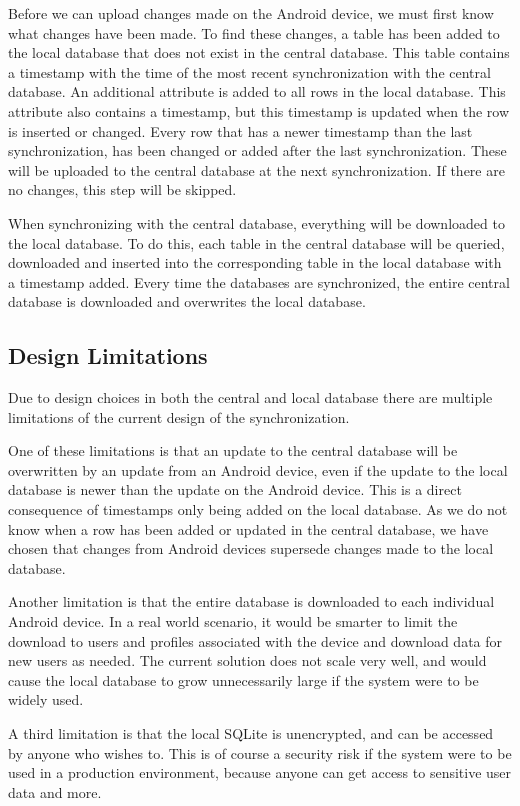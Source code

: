 Before we can upload changes made on the Android device, we must first know what changes have been made. To find these changes, a table has been added to the local database that does not exist in the central database. This table contains a timestamp with the time of the most recent synchronization with the central database. An additional attribute is added to all rows in the local database. This attribute also contains a timestamp, but this timestamp is updated when the row is inserted or changed. Every row that has a newer timestamp than the last synchronization, has been changed or added after the last synchronization. These will be uploaded to the central database at the next synchronization. If there are no changes, this step will be skipped.

When synchronizing with the central database, everything will be downloaded to the local database. To do this, each table in the central database will be queried, downloaded and inserted into the corresponding table in the local database with a timestamp added. Every time the databases are synchronized, the entire central database is downloaded and overwrites the local database.

\subsection{Design Limitations}
Due to design choices in both the central and local database there are multiple limitations of the current design of the synchronization.

One of these limitations is that an update to the central database will be overwritten by an update from an Android device, even if the update to the local database is newer than the update on the Android device. This is a direct consequence of timestamps only being added on the local database. As we do not know when a row has been added or updated in the central database, we have chosen that changes from Android devices supersede changes made to the local database.

Another limitation is that the entire database is downloaded to each individual Android device. In a real world scenario, it would be smarter to limit the download to users and profiles associated with the device and download data for new users as needed. The current solution does not scale very well, and would cause the local database to grow unnecessarily large if the system were to be widely used.

A third limitation is that the local SQLite is unencrypted, and can be accessed by anyone who wishes to. This is of course a security risk if the system were to be used in a production environment, because anyone can get access to sensitive user data and more.